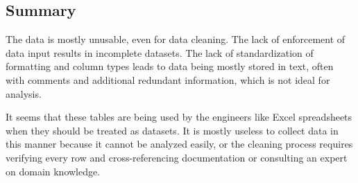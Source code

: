 \subsection{Summary}
The data is mostly unusable, even for data cleaning. The lack of enforcement of data input results in incomplete datasets. The lack of standardization of formatting and column types leads to data being mostly stored in text, often with comments and additional redundant information, which is not ideal for analysis.

It seems that these tables are being used by the engineers like Excel spreadsheets when they should be treated as datasets. It is mostly useless to collect data in this manner because it cannot be analyzed easily, or the cleaning process requires verifying every row and cross-referencing documentation or consulting an expert on domain knowledge.
